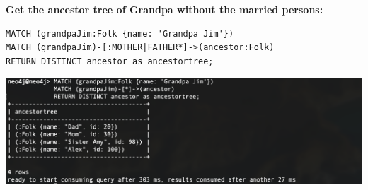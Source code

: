 \documentclass[14pt,a4paper]{extarticle}
\begin{document}
	\noindent \textbf{Get the ancestor tree of Grandpa without the married persons:}
	\begin{lstlisting}[style=sql]
MATCH (grandpaJim:Folk {name: 'Grandpa Jim'})
MATCH (grandpaJim)-[:MOTHER|FATHER*]->(ancestor:Folk)
RETURN DISTINCT ancestor as ancestortree;
	\end{lstlisting}
	\includegraphics[width=\textwidth]{images/sc06.png}



	

\end{document}
